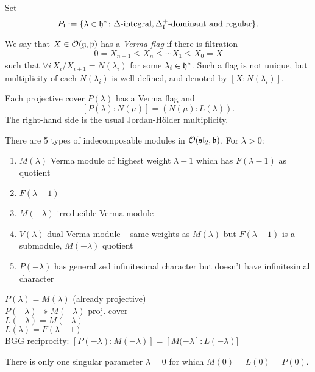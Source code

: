 \documentclass[a4paper,10pt]{article}
\begin{document}
Set
\[
 P_{\mathfrak{l}} := \{ \lambda \in \mathfrak{h}^\ast \colon \Delta\text{-integral}, \Delta^+_{\mathfrak{l}}\text{-dominant and regular} \}.
\]%

We say that $X \in \mathcal{O}(\mathfrak{g}, \mathfrak{p})$ has a \emph{Verma flag} if there is filtration
\[
 0 = X_{n+1} \leq X_n \leq \cdots X_1 \leq X_0 = X
\]
such that $\forall i\, X_i / X_{i+1} = N(\lambda_i)$ for some $\lambda_i \in \mathfrak{h}^*$. Such a flag is not unique, but multiplicity of each $N(\lambda_i)$ is well defined, and denoted by $[X \colon N(\lambda_i)]$.

\begin{theorem}
Each projective cover $P(\lambda)$ has a Verma flag and
 \[
  [P(\lambda) : N(\mu) ] = (N(\mu) : L(\lambda)).
 \]
 The right-hand side is the usual Jordan-H\"{o}lder multiplicity.
\end{theorem}


\begin{example}[$\lie{sl}_2$]
 There are 5 types of indecomposable modules in $\mathcal{O}(\mathfrak{sl}_2, \mathfrak{b})$. For $\lambda > 0$:
 \begin{enumerate}
  \item $M(\lambda)$  Verma module of highest weight $\lambda - 1$ which has $F(\lambda -1)$ as quotient
  \item $F(\lambda -1)$
  \item $M(-\lambda)$ irreducible Verma module
  \item $V(\lambda)$ dual Verma module -- same weights as $M(\lambda)$ but $F(\lambda-1)$ is a submodule, $M(-\lambda)$ quotient
  \item $P(-\lambda)$ has generalized infinitesimal character but doesn't have infinitesimal character \\
 \end{enumerate}
$P(\lambda) = M(\lambda)$ (already projective)\\
$P(-\lambda) \twoheadrightarrow M(-\lambda)$ proj. cover \\
$L(-\lambda) = M(-\lambda)$ \\
$L(\lambda) = F(\lambda-1)$\\

BGG reciprocity: $[P(-\lambda) : M(-\lambda)] = [M(-\lambda] : L(-\lambda)]$

There is only one singular parameter $\lambda = 0$ for which $M(0) = L(0) = P(0)$.
\end{example}
\end{document}
